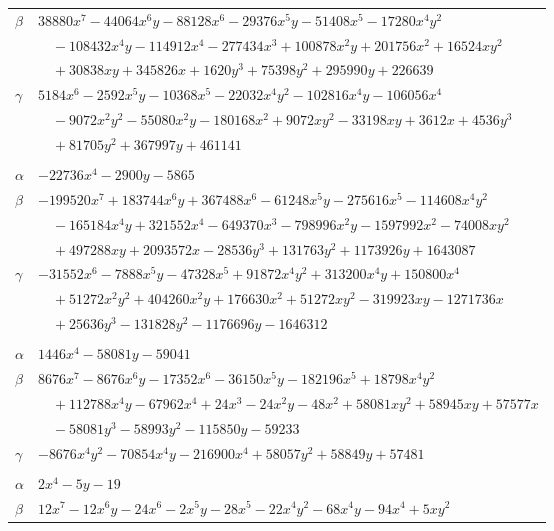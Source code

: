 \documentclass[11pt]{article}
\begin{document}
\begin{longtable}{@{}ll@{}}
$\beta$ & $38880x^{7}-44064x^{6}y-88128x^{6}-29376x^{5}y-51408x^{5}-17280x^{4}y^{2}$\\
 & $\quad -108432x^{4}y-114912x^{4}-277434x^{3}+100878x^{2}y+201756x^{2}+16524xy^{2}$\\
 & $\quad +30838xy+345826x+1620y^{3}+75398y^{2}+295990y+226639$\\
$\gamma$ & $5184x^{6}-2592x^{5}y-10368x^{5}-22032x^{4}y^{2}-102816x^{4}y-106056x^{4}$\\
 & $\quad -9072x^{2}y^{2}-55080x^{2}y-180168x^{2}+9072xy^{2}-33198xy+3612x+4536y^{3}$\\
 & $\quad +81705y^{2}+367997y+461141$\\
\addlinespace[3pt]
\multicolumn{2}{@{}l}{$\{i,j\}=\{7,78\}$, $k_{ij}=3^{2}\cdot 5\cdot 13$}\\
$\alpha$ & $-22736x^{4}-2900y-5865$\\
$\beta$ & $-199520x^{7}+183744x^{6}y+367488x^{6}-61248x^{5}y-275616x^{5}-114608x^{4}y^{2}$\\
 & $\quad -165184x^{4}y+321552x^{4}-649370x^{3}-798996x^{2}y-1597992x^{2}-74008xy^{2}$\\
 & $\quad +497288xy+2093572x-28536y^{3}+131763y^{2}+1173926y+1643087$\\
$\gamma$ & $-31552x^{6}-7888x^{5}y-47328x^{5}+91872x^{4}y^{2}+313200x^{4}y+150800x^{4}$\\
 & $\quad +51272x^{2}y^{2}+404260x^{2}y+176630x^{2}+51272xy^{2}-319923xy-1271736x$\\
 & $\quad +25636y^{3}-131828y^{2}-1176696y-1646312$\\
\addlinespace[3pt]
\multicolumn{2}{@{}l}{$\{i,j\}=\{7,93\}$, $k_{ij}=2^{3}\cdot 3^{5}$}\\
$\alpha$ & $1446x^{4}-58081y-59041$\\
$\beta$ & $8676x^{7}-8676x^{6}y-17352x^{6}-36150x^{5}y-182196x^{5}+18798x^{4}y^{2}$\\
 & $\quad +112788x^{4}y-67962x^{4}+24x^{3}-24x^{2}y-48x^{2}+58081xy^{2}+58945xy+57577x$\\
 & $\quad -58081y^{3}-58993y^{2}-115850y-59233$\\
$\gamma$ & $-8676x^{4}y^{2}-70854x^{4}y-216900x^{4}+58057y^{2}+58849y+57481$\\
\addlinespace[3pt]
\multicolumn{2}{@{}l}{$\{i,j\}=\{7,106\}$, $k_{ij}=2\cdot 3^{2}$}\\
$\alpha$ & $2x^{4}-5y-19$\\
$\beta$ & $12x^{7}-12x^{6}y-24x^{6}-2x^{5}y-28x^{5}-22x^{4}y^{2}-68x^{4}y-94x^{4}+5xy^{2}$\\

\end{longtable}
\end{document}
